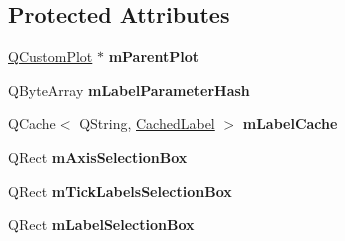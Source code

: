 \subsection*{\-Protected \-Attributes}
\begin{DoxyCompactItemize}
\item 
\hypertarget{classQCPAxisPainterPrivate_a882029a5f2d4abd71289d415c9b90a28}{\hyperlink{classQCustomPlot}{\-Q\-Custom\-Plot} $\ast$ {\bfseries m\-Parent\-Plot}}\label{classQCPAxisPainterPrivate_a882029a5f2d4abd71289d415c9b90a28}

\item 
\hypertarget{classQCPAxisPainterPrivate_aab8be59df22ed4e43e3a6d511cbc466a}{\-Q\-Byte\-Array {\bfseries m\-Label\-Parameter\-Hash}}\label{classQCPAxisPainterPrivate_aab8be59df22ed4e43e3a6d511cbc466a}

\item 
\hypertarget{classQCPAxisPainterPrivate_a07ac270ea0c0ae084debd48d6a740e35}{\-Q\-Cache$<$ \-Q\-String, \hyperlink{structQCPAxisPainterPrivate_1_1CachedLabel}{\-Cached\-Label} $>$ {\bfseries m\-Label\-Cache}}\label{classQCPAxisPainterPrivate_a07ac270ea0c0ae084debd48d6a740e35}

\item 
\hypertarget{classQCPAxisPainterPrivate_a9d7586f4923994488bdd006415b13f5f}{\-Q\-Rect {\bfseries m\-Axis\-Selection\-Box}}\label{classQCPAxisPainterPrivate_a9d7586f4923994488bdd006415b13f5f}

\item 
\hypertarget{classQCPAxisPainterPrivate_a0adaf5f1d89be0f32dc4a904d157e5a9}{\-Q\-Rect {\bfseries m\-Tick\-Labels\-Selection\-Box}}\label{classQCPAxisPainterPrivate_a0adaf5f1d89be0f32dc4a904d157e5a9}

\item 
\hypertarget{classQCPAxisPainterPrivate_abac9a47048d537f72ca147b6f29d30f1}{\-Q\-Rect {\bfseries m\-Label\-Selection\-Box}}\label{classQCPAxisPainterPrivate_abac9a47048d537f72ca147b6f29d30f1}

\end{DoxyCompactItemize}


